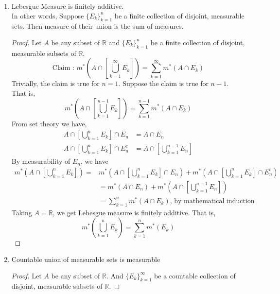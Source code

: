 \begin{enumerate}
	\item Lebesgue Measure is finitely additive.\\
		In other words, Suppose $\{E_k\}_{k = 1}^n$ be a finite collection of disjoint, measurable sets.
		Then measure of their union is the sum of measures.
	\begin{proof}
	Let $A$ be any subset of $\mathbb{R}$ and $\{ E_k \}_{k=1}^n$ be a finite collection of disjoint, measurable subsets of $\mathbb{R}$.
	\begin{equation}
		\text{Claim : }	m^\ast \left( A \cap \left[ \bigcup_{k=1}^\infty E_k\right] \right) = \sum_{k=1}^\infty m^\ast (A \cap E_k)
	\end{equation}
	Trivially, the claim is true for $n=1$.
		Suppose the claim is true for $n-1$.
		That is,
	\begin{equation}
		m^\ast \left( A \cap \left[ \bigcup_{k=1}^{n-1} E_k \right] \right) = \sum_{k=1}^{n-1} m^\ast (A \cap E_k)
	\end{equation}
	From set theory we have,
	\begin{align}
		A \cap \left[ \bigcup_{k=1}^n E_k \right] \cap E_n & = A \cap E_n\\
		A \cap \left[ \bigcup_{k=1}^n E_k \right] \cap E_n^c  & = A \cap \left[ \bigcup_{k=1}^{n-1} E_n \right]
	\end{align}
	By measurability of $E_n$, we have
	\begin{align*}
		m^\ast \left( A \cap \left[ \bigcup_{k=1}^n E_k \right] \right) = & m^\ast \left( A \cap \left[ \bigcup_{k=1}^n E_k \right] \cap E_n \right) + m^\ast \left( A \cap \left[ \bigcup_{k=1}^n E_k \right] \cap E_n^c \right)\\
		& = m^\ast \left( A \cap E_n \right) + m^\ast  \left( A \cap \left[ \bigcup_{k=1}^{n-1} E_n \right] \right) \\
		& =  \sum_{k=1}^n m^\ast \left( A \cap E_k \right) \text{, by mathematical induction}
	\end{align*}
	Taking $A = \mathbb{R}$, we get Lebesgue measure is finitely additive.
		That is,
	\begin{equation}
		m^\ast \left( \bigcup_{k=1}^n E_k \right) = \sum_{k=1}^n m^\ast \left( E_k \right)
	\end{equation}
	\end{proof}
	\item Countable union of measurable sets is measurable
	\begin{proof}
		Let $A$ be any subset of $\mathbb{R}$.
		And $\{ E_k \}_{k=1}^\infty$ be a countable collection of disjoint, measurable subsets of $\mathbb{R}$.

\end{proof}
\end{enumerate}
